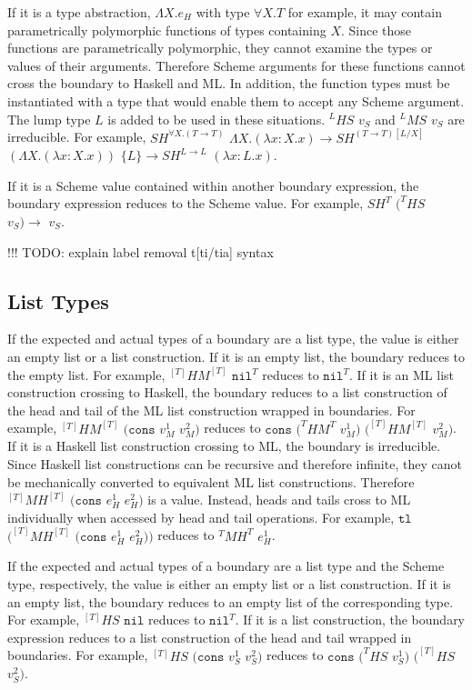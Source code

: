 If it is a type abstraction, $\Lambda X.e_{H}$ with type $\forall X.T$ for example, it may contain parametrically polymorphic functions of types containing $X$.  Since those functions are parametrically polymorphic, they cannot examine the types or values of their arguments.  Therefore Scheme arguments for these functions cannot cross the boundary to Haskell and ML.  In addition, the function types must be instantiated with a type that would enable them to accept any Scheme argument.  The lump type $L$ is added to be used in these situations.  $^{L}HS$ $v_{S}$ and $^{L}MS$ $v_{S}$ are irreducible.  For example, $SH^{\forall X.(T\rightarrow T)}$ $\Lambda X.(\lambda x:X.x)\rightarrow SH^{(T\rightarrow T)[L/X]}$ $(\Lambda X.(\lambda x:X.x))$ $\lbrace L\rbrace\rightarrow SH^{L\rightarrow L}$ $(\lambda x:L.x)$.

If it is a Scheme value contained within another boundary expression, the boundary expression reduces to the Scheme value.  For example, $SH^{T}$ $(^{T}HS$ $v_{S})\rightarrow$ $v_{S}$.

!!! TODO: explain label removal t[ti/tia] syntax

\subsection{List Types}

If the expected and actual types of a boundary are a list type, the value is either an empty list or a list construction.  If it is an empty list, the boundary reduces to the empty list.  For example, $^{[T]}HM^{[T]}$ $\mathtt{nil}^{T}$ reduces to $\mathtt{nil}^{T}$.  If it is an ML list construction crossing to Haskell, the boundary reduces to a list construction of the head and tail of the ML list construction wrapped in boundaries.  For example, $^{[T]}HM^{[T]}$ $(\mathtt{cons}$ $v_{M}^{1}$ $v_{M}^{2})$ reduces to $\mathtt{cons}$ $(^{T}HM^{T}$ $v_{M}^{1})$ $(^{[T]}HM^{[T]}$ $v_{M}^{2})$.  If it is a Haskell list construction crossing to ML, the boundary is irreducible.  Since Haskell list constructions can be recursive and therefore infinite, they canot be mechanically converted to equivalent ML list constructions.  Therefore $^{[T]}MH^{[T]}$ $(\mathtt{cons}$ $e_{H}^{1}$ $e_{H}^{2})$ is a value.  Instead, heads and tails cross to ML individually when accessed by head and tail operations.  For example, $\mathtt{tl}$ $(^{[T]}MH^{[T]}$ $(\mathtt{cons}$ $e_{H}^{1}$ $e_{H}^{2}))$ reduces to $^{T}MH^{T}$ $e_{H}^{1}$.

If the expected and actual types of a boundary are a list type and the Scheme type, respectively, the value is either an empty list or a list construction.  If it is an empty list, the boundary reduces to an empty list of the corresponding type.  For example, $^{[T]}HS$ $\mathtt{nil}$ reduces to $\mathtt{nil}^{T}$.  If it is a list construction, the boundary expression reduces to a list construction of the head and tail wrapped in boundaries.  For example, $^{[T]}HS$ $(\mathtt{cons}$ $v_{S}^{1}$ $v_{S}^{2})$ reduces to $\mathtt{cons}$ $(^{T}HS$ $v_{S}^{1})$ $(^{[T]}HS$ $v_{S}^{2})$.

